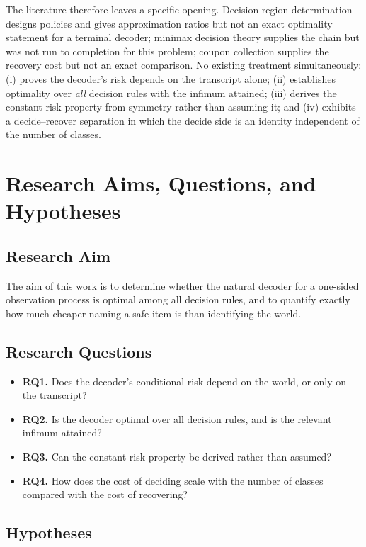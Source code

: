 The literature therefore leaves a specific opening. Decision-region determination designs
policies and gives approximation ratios but not an exact optimality statement for a terminal
decoder; minimax decision theory supplies the chain but was not run to completion for this
problem; coupon collection supplies the recovery cost but not an exact comparison. No existing
treatment simultaneously: (i) proves the decoder's risk depends on the transcript alone;
(ii) establishes optimality over \emph{all} decision rules with the infimum attained;
(iii) derives the constant-risk property from symmetry rather than assuming it; and
(iv) exhibits a decide--recover separation in which the decide side is an identity independent
of the number of classes.

\section{Research Aims, Questions, and Hypotheses}

\subsection{Research Aim}

The aim of this work is to determine whether the natural decoder for a one-sided observation
process is optimal among all decision rules, and to quantify exactly how much cheaper naming
a safe item is than identifying the world.

\subsection{Research Questions}

\begin{itemize}
\item \textbf{RQ1.} Does the decoder's conditional risk depend on the world, or only on the
transcript?
\item \textbf{RQ2.} Is the decoder optimal over all decision rules, and is the relevant
infimum attained?
\item \textbf{RQ3.} Can the constant-risk property be derived rather than assumed?
\item \textbf{RQ4.} How does the cost of deciding scale with the number of classes compared
with the cost of recovering?
\end{itemize}

\subsection{Hypotheses}

